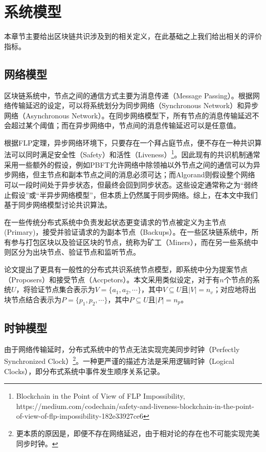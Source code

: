 \section{系统模型}
本章节主要给出区块链共识涉及到的相关定义，在此基础之上我们给出相关的评价指标。

\subsection{网络模型}
区块链系统中，节点之间的通信方式主要为消息传递（Message Passing）。根据网络传输延迟的设定，可以将系统划分为同步网络（Synchronous Network）和异步网络（Asynchronous Network）。在同步网络模型下，所有节点的消息传输延迟不会超过某个阈值；而在异步网络中，节点间的消息传输延迟可以是任意值。

根据FLP定理\cite{fischer1982impossibility}，异步网络环境下，只要存在一个拜占庭节点，便不存在一种共识算法可以同时满足安全性（Safety）和活性（Liveness）\footnote{Blockchain in the Point of View of FLP Impossibility, https://medium.com/codechain/safety-and-liveness-blockchain-in-the-point-of-view-of-flp-impossibility-182e33927ce6}。因此现有的共识机制通常采用一些额外的假设，例如PBFT允许网络中除领袖以外节点之间的通信可以为异步网络，但主节点和副本节点之间的消息必须可达\cite{castro1999practical}；而Algorand则假设整个网络可以一段时间处于异步状态，但最终会回到同步状态\cite{gilad2017algorand}。这些设定通常称之为“弱终止假设”或“半异步网络模型”，但本质上仍然属于同步网络。综上，在本文中我们基于同步网络模型讨论共识算法。


在一些传统分布式系统中负责发起状态更变请求的节点被定义为主节点(Primary)，接受并验证请求的为副本节点（Backups）\cite{lamport2001paxos,castro1999practical}。在一些区块链系统中，所有参与打包区块以及验证区块的节点，统称为矿工（Miners），而在另一些系统中则区分为出块节点、验证节点和监听节点\cite{ultrain2019}。

论文\cite{howard2019consensus}提出了更具有一般性的分布式共识系统节点模型，即系统中分为提案节点（Proposers）和接受节点（Accpetors）。本文采用类似设定，对于有$n$个节点的系统$U$，将验证节点集合表示为$V=\{a_1,a_2,\cdots\}$，其中$V\subseteq U$且$|V|=n_v$；对应地将出块节点结合表示为$P=\{p_1,p_2,\cdots\}$，其中$P\subseteq U$且$|P|=n_p$。


\subsection{时钟模型}
由于网络传输延时，分布式系统中的节点无法实现完美同步时钟（Perfectly Synchronized Clock）\footnote{更本质的原因是，即便不存在网络延迟，由于相对论的存在也不可能实现完美同步时钟。}。一种更严谨的描述方法是采用逻辑时钟（Logical Clocks）\cite{lamport1978time}，即分布式系统中事件发生顺序关系记录。

